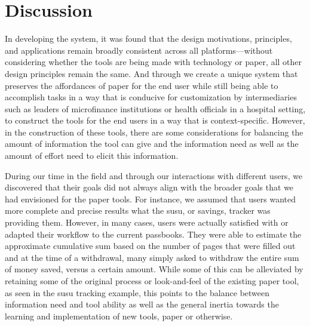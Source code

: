 \documentclass{sig-alternate}
\begin{document}

\section{Discussion}
\label{sec:discussion}


In developing the \nifty system, it was found that the design motivations, principles, and applications remain broadly consistent across all platforms---without considering whether the tools are being made with technology or paper, all other design principles remain the same. And through \nifty we create a unique system that preserves the affordances of paper for the end user while still being able to accomplish tasks in a way that is conducive for customization by intermediaries such as leaders of microfinance institutions or health officials in a hospital setting, to construct the tools for the end users in a way that is context-specific. However, in the construction of these tools, there are some considerations for balancing the amount of information the tool can give and the information need as well as the amount of effort need to elicit this information.

During our time in the field and through our interactions with different users, we discovered that their goals did not always align with the broader goals that we had envisioned for the paper tools. For instance, we assumed that users wanted more complete and precise results what the susu, or savings, tracker was providing them. However, in many cases, users were actually satisfied with or adapted their workflow to the current passbooks. They were able to estimate the approximate cumulative sum based on the number of pages that were filled out and at the time of a withdrawal, many simply asked to withdraw the entire sum of money saved, versus a certain amount. While some of this can be alleviated by retaining some of the original process or look-and-feel of the existing paper tool, as seen in the susu tracking example, this points to the balance between information need and tool ability as well as the general inertia towards the learning and implementation of new tools, paper or otherwise.
\end{document}
